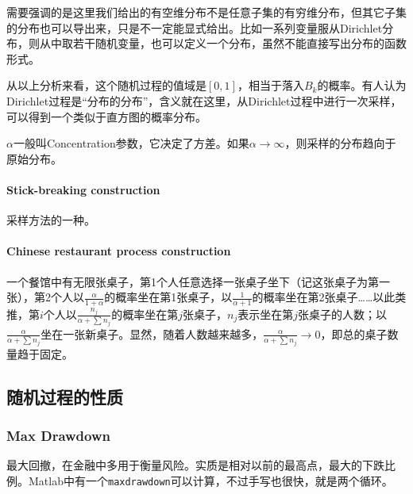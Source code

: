 需要强调的是这里我们给出的有空维分布不是任意子集的有穷维分布，但其它子集的分布也可以导出来，只是不一定能显式给出。比如一系列变量服从Dirichlet分布，则从中取若干随机变量，也可以定义一个分布，虽然不能直接写出分布的函数形式。

从以上分析来看，这个随机过程的值域是$[0,1]$，相当于落入$B_k$的概率。有人认为Dirichlet过程是“分布的分布”，含义就在这里，从Dirichlet过程中进行一次采样，可以得到一个类似于直方图的概率分布。

$\alpha$一般叫Concentration参数，它决定了方差。如果$\alpha\rightarrow \infty$，则采样的分布趋向于原始分布。

\paragraph*{Stick-breaking construction}采样方法的一种。

\paragraph*{Chinese restaurant process construction}一个餐馆中有无限张桌子，第1个人任意选择一张桌子坐下（记这张桌子为第一张），第2个人以$\frac{\alpha}{1+\alpha}$的概率坐在第1张桌子，以$\frac{1}{\alpha+1}$的概率坐在第2张桌子……以此类推，第$i$个人以$\frac{n_j}{\alpha+\sum n_j}$的概率坐在第$j$张桌子，$n_j$表示坐在第$j$张桌子的人数；以$\frac{\alpha}{\alpha+\sum n_j}$坐在一张新桌子。显然，随着人数越来越多，$\frac{\alpha}{\alpha+\sum n_j}\rightarrow 0$，即总的桌子数量趋于固定。

\subsection{随机过程的性质}
\subsubsection{Max Drawdown}
最大回撤，在金融中多用于衡量风险。实质是相对以前的最高点，最大的下跌比例。Matlab中有一个\texttt{maxdrawdown}可以计算，不过手写也很快，就是两个循环。

